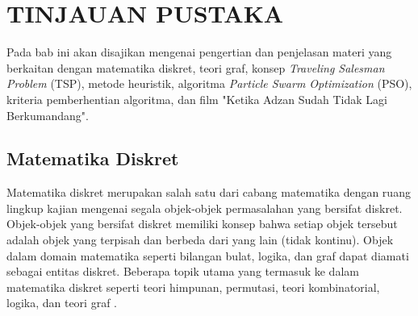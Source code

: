 \renewcommand{\thechapter}{\Roman{chapter}}
\chapter{TINJAUAN PUSTAKA}\label{babDua}
\renewcommand{\thechapter}{\arabic{chapter}}
\vspace{8mm}

{\frenchspacing
    Pada bab ini akan disajikan mengenai pengertian dan penjelasan materi yang berkaitan dengan matematika diskret, teori graf,
    konsep \textit{Traveling Salesman Problem} (TSP), metode heuristik, algoritma \textit{Particle Swarm Optimization} (PSO), kriteria pemberhentian algoritma,
    dan film "Ketika Adzan Sudah Tidak Lagi Berkumandang".
}
\vspace{-3mm}

\section{Matematika Diskret}
\vspace{-4mm}
{\frenchspacing
    Matematika diskret merupakan salah satu dari cabang matematika dengan ruang lingkup kajian mengenai
    segala objek-objek permasalahan yang bersifat diskret.
    Objek-objek yang bersifat diskret memiliki konsep bahwa setiap objek tersebut adalah objek yang terpisah
    dan berbeda dari yang lain (tidak kontinu).
    Objek dalam domain matematika seperti bilangan bulat, logika, dan graf dapat diamati sebagai entitas diskret.
    Beberapa topik utama yang termasuk ke dalam matematika diskret seperti teori himpunan, permutasi, teori kombinatorial, logika, dan teori graf .
}
\vspace{-3mm}


